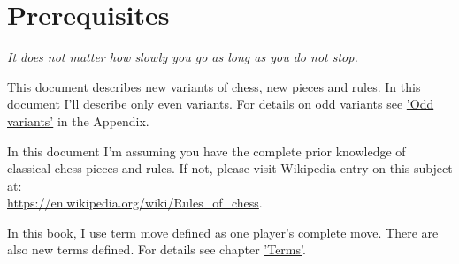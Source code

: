
\chapter*{Prerequisites}

\begin{flushright}
\parbox{0.7\textwidth}{
\emph{It does not matter how slowly you go as long as you do not stop. \\
 } }
\end{flushright}

\noindent
This document describes new variants of chess, new pieces and rules. In this document I'll describe only
even variants. For details on odd variants see \hyperref[sec:Appendix/Odd variants]{'Odd variants'} in the Appendix.

In this document I'm assuming you have the complete prior knowledge of classical chess pieces and rules.
If not, please visit Wikipedia entry on this subject at: \\
\href{https://en.wikipedia.org/wiki/Rules\_of\_chess}{https://en.wikipedia.org/wiki/Rules\_of\_chess}.

In this book, I use term move defined as one player's complete move. There are also new terms defined.
For details see chapter \hyperref[ch:Terms]{'Terms'}.

\clearpage %
